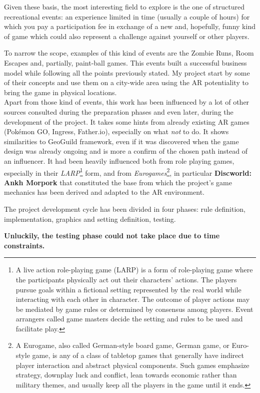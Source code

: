 	Given these basis, the most interesting field to explore is the one of structured recreational events: an experience limited in time (usually a couple of hours) for which you pay a participation fee in exchange of a new and, hopefully, funny kind of game which could also represent a challenge against yourself or other players.
	
	To narrow the scope, examples of this kind of events are the Zombie Runs, Room Escapes and, partially, paint-ball games. This events built a successful business model while following all the points previously stated.
	My project start by some of their concepts and use them on a city-wide area using the AR potentiality to bring the game in physical locations. \\
	
	Apart from those kind of events, this work has been influenced by a lot of other sources consulted during the preparation phases and even later, during the development of the project.
	It takes some hints from already existing AR games (Pokémon GO, Ingress, Father.io), especially on what \emph{not} to do.
	It shows similarities to GeoGuild\cite{ionescu:geoguild} framework, even if it was discovered when the game design was already ongoing and is more a confirm of the chosen path instead of an influencer.
	It had been heavily influenced both from role playing games, especially in their \emph{LARP}\footnote{A live action role-playing game (LARP) is a form of role-playing game where the participants physically act out their characters' actions. The players pursue goals within a fictional setting represented by the real world while interacting with each other in character. The outcome of player actions may be mediated by game rules or determined by consensus among players. Event arrangers called game masters decide the setting and rules to be used and facilitate play.\cite{wiki:larp}} form, and from \emph{Eurogames}\footnote{A Eurogame, also called German-style board game, German game, or Euro-style game, is any of a class of tabletop games that generally have indirect player interaction and abstract physical components. Such games emphasize strategy, downplay luck and conflict, lean towards economic rather than military themes, and usually keep all the players in the game until it ends.\cite{wiki:eurogame}}, in particular \textbf{Discworld: Ankh Morpork} that constituted the base from which the project's game mechanics has been derived and adapted to the AR environment.
	
	The project development cycle has been divided in four phases: rule definition, implementation, graphics and setting definition, testing.
	
	\textbf{Unluckily, the testing phase could not take place due to time constraints.}
